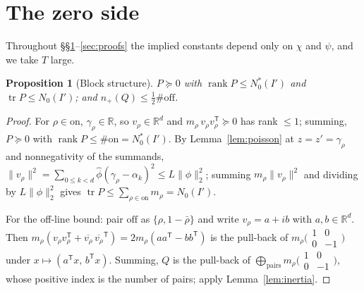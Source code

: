 \documentclass[11pt]{amsart}
\newtheorem{proposition}[theorem]{Proposition}
\theoremstyle{definition}
\theoremstyle{remark}
\numberwithin{equation}{section}
\DeclareMathOperator{\tr}{tr}
\DeclareMathOperator{\rank}{rank}
\newcommand{\RR}{\mathbb{R}}
\newcommand{\wh}{\widehat}
\newcommand{\ol}{\overline}
\newcommand{\npl}{n_{+}}
\begin{document}
\section{The zero side}\label{sec:zero}

Throughout \S\S\ref{sec:zero}--\ref{sec:proofs} the implied constants depend only on $\chi$ and $\psi$, and we take $T$ large.

\begin{proposition}[Block structure]\label{prop:block}
$P\succeq0$ with $\rank P\le N_0^{*}(I')$ and $\tr P\le N_0(I')$; and $\npl(Q)\le\tfrac12\#\mathrm{off}$.
\end{proposition}
\begin{proof}
For $\rho\in\mathrm{on}$, $\gamma_\rho\in\RR$, so $v_\rho\in\RR^d$ and $m_\rho\,v_\rho v_\rho^{\mathsf T}\succeq0$ has rank $\le1$; summing, $P\succeq0$ with $\rank P\le\#\mathrm{on}=N_0^{*}(I')$. By Lemma~\ref{lem:poisson} at $z=z'=\gamma_\rho$ and nonnegativity of the summands, $\|v_\rho\|^2=\sum_{0\le k<d}\wh\phi(\gamma_\rho-\alpha_k)^2\le L\|\phi\|_2^2$; summing $m_\rho\|v_\rho\|^2$ and dividing by $L\|\phi\|_2^2$ gives $\tr P\le\sum_{\rho\in\mathrm{on}}m_\rho=N_0(I')$.

For the off-line bound: pair $\mathrm{off}$ as $\{\rho,1-\bar\rho\}$ and write $v_\rho=a+ib$ with $a,b\in\RR^d$. Then $m_\rho(v_\rho v_\rho^{\mathsf T}+\ol{v_\rho}\,\ol{v_\rho}^{\mathsf T})=2m_\rho(aa^{\mathsf T}-bb^{\mathsf T})$ is the pull-back of $m_\rho\bigl(\begin{smallmatrix}1&0\\0&-1\end{smallmatrix}\bigr)$ under $x\mapsto(a^{\mathsf T}x,\,b^{\mathsf T}x)$. Summing, $Q$ is the pull-back of $\bigoplus_{\text{pairs}}m_\rho\bigl(\begin{smallmatrix}1&0\\0&-1\end{smallmatrix}\bigr)$, whose positive index is the number of pairs; apply Lemma~\ref{lem:inertia}.
\end{proof}
\end{document}
